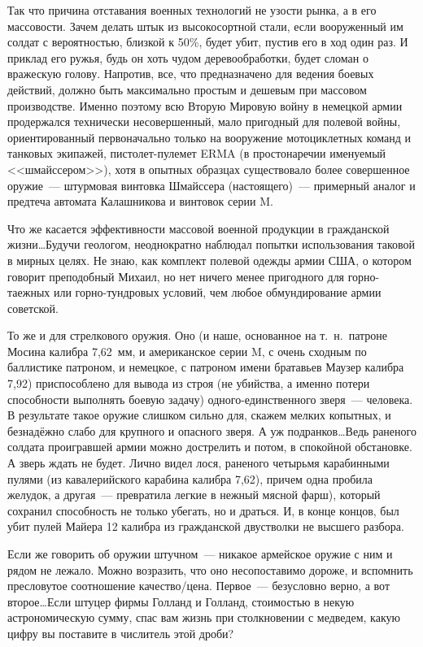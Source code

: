 Так что причина отставания военных технологий не узости рынка, а в его массовости. Зачем делать штык из высокосортной стали, если вооруженный им солдат с вероятностью, близкой к 50\%, будет убит, пустив его в ход один раз. И приклад его ружья, будь он хоть чудом деревообработки, будет сломан о вражескую голову. Напротив, все, что предназначено для ведения боевых действий, должно быть максимально простым и дешевым при массовом производстве. Именно поэтому всю Вторую Мировую войну в немецкой армии продержался технически несовершенный, мало пригодный для полевой войны, ориентированный первоначально только на вооружение мотоциклетных команд и танковых экипажей, пистолет-пулемет ERMA (в простонаречии именуемый <<шмайссером>>), хотя в опытных образцах существовало более совершенное оружие~--- штурмовая винтовка Шмайссера (настоящего)~--- примерный аналог и предтеча автомата Калашникова и винтовок серии M. 

Что же касается эффективности массовой военной продукции в гражданской жизни\dots Будучи геологом, неоднократно наблюдал попытки использования таковой в мирных целях. Не знаю, как комплект полевой одежды армии США, о котором говорит преподобный Михаил, но нет ничего менее пригодного для горно-таежных или горно-тундровых условий, чем любое обмундирование армии советской. 

То же и для стрелкового оружия. Оно (и наше, основанное на т.~н.~патроне Мосина калибра 7,62~мм, и американское серии M, с очень сходным по баллистике патроном, и немецкое, с патроном имени братавьев Маузер калибра 7,92) приспособлено для вывода из строя (не убийства, а именно потери способности выполнять боевую задачу) одного-единственного зверя~--- человека. В результате такое оружие слишком сильно для, скажем мелких копытных, и безнадёжно слабо для крупного и опасного зверя. А уж подранков\dots Ведь раненого солдата проигравшей армии можно дострелить и потом, в спокойной обстановке. А зверь ждать не будет. Лично видел лося, раненого четырьмя карабинными пулями (из кавалерийского карабина калибра 7,62), причем одна пробила желудок, а другая~--- превратила легкие в нежный мясной фарш), который сохранил способность не только убегать, но и драться. И, в конце концов, был убит пулей Майера 12 калибра из гражданской двустволки не высшего разбора. 

Если же говорить об оружии штучном~--- никакое армейское оружие с ним и рядом не лежало. Можно возразить, что оно несопоставимо дороже, и вспомнить пресловутое соотношение качество/цена. Первое~--- безусловно верно, а вот второе\dots Если штуцер фирмы Голланд и Голланд, стоимостью в некую астрономическую сумму, спас вам жизнь при столкновении с медведем, какую цифру вы поставите в числитель этой дроби? 

